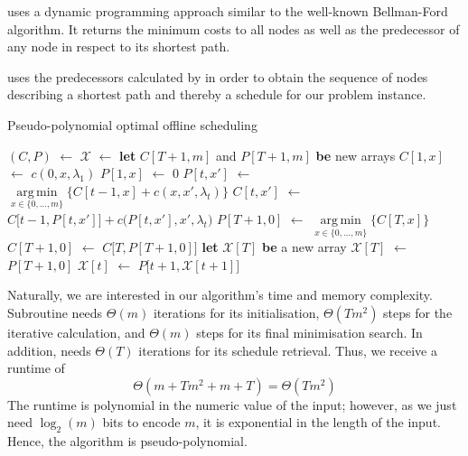 \documentclass[hidelinks]{article}
\newcommand\Let[2]{\State #1 $\gets$ #2}
\newcommand\Blet[2]{\State \textbf{let} #1 \textbf{be} #2}
\theoremstyle{plain}
\theoremstyle{definition}
\theoremstyle{rem}
\DeclareMathOperator*{\argmin}{arg\,min}
\newcommand{\mx}{\mathcal{X}}
\newcommand{\costs}{c}
\newcommand{\fromto}[2]{\{#1,\ldots,#2\}}
\begin{document}
 uses a dynamic programming approach similar to the well-known Bellman-Ford algorithm. It returns the minimum costs to all nodes as well as the predecessor of any node in respect to its shortest path.

 uses the predecessors calculated by  in order to obtain the sequence of nodes describing a shortest path and thereby a schedule for our problem instance.
\begin{algorithm}[H]
  \caption{Pseudo-polynomial optimal offline scheduling}
  \begin{algorithmic}[1]
	  \Let{$(C,P)$}{}
	  \Let{$\mx$}{\Call{extract\_schedule}{$P,T$}}
	  \State \Return{$\mx$}
  \EndFunction
  \Statex
	\Blet{$C[T+1,m]$ and $P[T+1,m]$}{new arrays}
		\Let{$C[1,x]$}{$\costs(0,x,\lambda_1)$}
		\Let{$P[1,x]$}{$0$}
	\EndFor
			\Let{$P[t,x']$}{$\argmin\limits_{x\in\fromto{0}{m}}\bigl\{C[t-1,x]+\costs(x,x',\lambda_t)\bigr\}$}
			\Let{$C[t,x']$}{$C\bigl[t-1,P[t,x']\bigr]+c\bigl(P[t,x'],x',\lambda_t\bigr)$}
		\EndFor
	\EndFor
	\Let{$P[T+1,0]$}{$\argmin\limits_{x\in\fromto{0}{m}}\bigl\{C[T,x]\bigr\}$}
	\Let{$C[T+1,0]$}{$C\bigl[T,P[T+1,0]\bigr]$}
	\State {}
  \EndFunction
  \Statex
	\Blet{$\mx[T]$}{a new array}
    	\Let{$\mx[T]$}{$P[T+1,0]$}
		\Let{$\mx[t]$}{$P\bigl[t+1,\mx[t+1]\bigr]$}
	\EndFor
	\State \Return{$\mx$}
  \EndFunction

  \end{algorithmic}
\label{alg_opt_offline}
\end{algorithm}
Naturally, we are interested in our algorithm's time and memory complexity. Subroutine
 needs $\Theta(m)$ iterations for its initialisation, $\Theta(Tm^2)$ steps for the iterative calculation, and $\Theta(m)$ steps for its final minimisation search. In addition,  needs $\Theta(T)$ iterations for its schedule retrieval. Thus, we receive a runtime of 
\begin{equation*}
	\Theta(m+Tm^2+m+T)=\Theta(Tm^2)
\end{equation*}
The runtime is polynomial in the numeric value of the input; however, as we just need $\log_2(m)$ bits to encode $m$, it is exponential in the length of the input. Hence, the algorithm is pseudo-polynomial.
\end{document}

